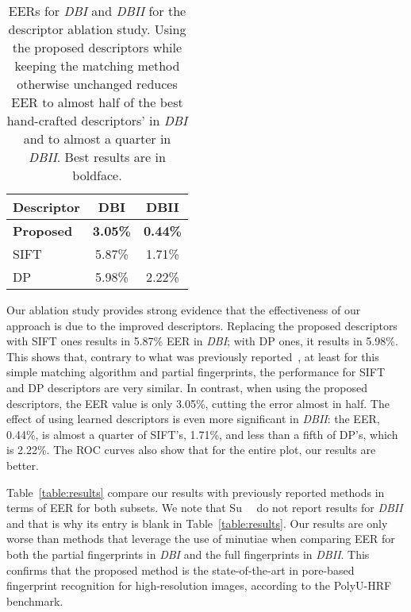 \documentclass[10pt,twocolumn,letterpaper]{article}
\begin{document}
\begin{table}[h]
  \begin{center}
    \begin{tabular}{l|c|c}
      \textbf{Descriptor}                                   & \textbf{DBI}    & \textbf{DBII} \\ \hline
      \textbf{Proposed}                                     & \textbf{3.05\%} & \textbf{0.44\%} \\ \hline
      SIFT                                                  & 5.87\%          & 1.71\% \\ \hline
      DP                                                    & 5.98\%          & 2.22\% \\
    \end{tabular}
  \end{center}
  \vspace{-4pt}
  \caption{EERs for \textit{DBI} and \textit{DBII} for the descriptor ablation study.
  Using the proposed descriptors while keeping the matching method otherwise unchanged reduces EER to almost half of the best hand-crafted descriptors' in \textit{DBI} and to almost a quarter in \textit{DBII}.
  Best results are in boldface.
  }
  \label{table:ablation}
\end{table}

Our ablation study provides strong evidence that the effectiveness of our approach is due to the improved descriptors.
Replacing the proposed descriptors with SIFT ones results in 5.87\% EER in \textit{DBI}; with DP ones, it results in 5.98\%.
This shows that, contrary to what was previously reported~\cite{direct-pore}, at least for this simple matching algorithm and partial fingerprints, the performance for SIFT and DP descriptors are very similar.
In contrast, when using the proposed descriptors, the EER value is only 3.05\%, cutting the error almost in half.
The effect of using learned descriptors is even more significant in \textit{DBII}: the EER, 0.44\%, is almost a quarter of SIFT's, 1.71\%, and less than a fifth of DP's, which is 2.22\%.
The ROC curves also show that for the entire plot, our results are better.

Table~\ref{table:results} compare our results with previously reported methods in terms of EER for both subsets.
We note that Su~\etal~\cite{su-pores-deep} do not report results for \textit{DBII} and that is why its entry is blank in Table~\ref{table:results}.
Our results are only worse than methods that leverage the use of minutiae when comparing EER for both the partial fingerprints in \textit{DBI} and the full fingerprints in \textit{DBII}.
This confirms that the proposed method is the state-of-the-art in pore-based fingerprint recognition for high-resolution images, according to the PolyU-HRF benchmark.
\end{document}
